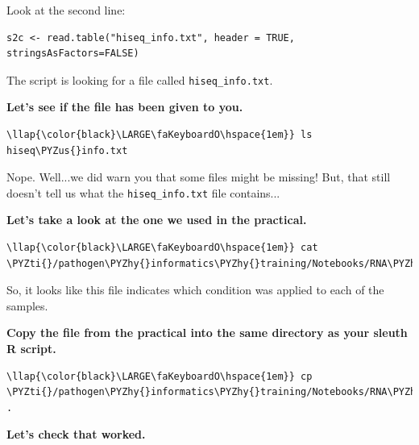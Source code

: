 \documentclass[11pt]{article}
\def\PYZus{\char`\_}
\def\PYZhy{\char`\-}
\def\PYZti{\char`\~}
\begin{document}
    Look at the second line:

\begin{verbatim}
s2c <- read.table("hiseq_info.txt", header = TRUE, stringsAsFactors=FALSE)
\end{verbatim}

The script is looking for a file called \texttt{hiseq\_info.txt}.

\textbf{Let's see if the file has been given to you.}

\begin{terminalinput}
\begin{Verbatim}[commandchars=\\\{\}]
\llap{\color{black}\LARGE\faKeyboardO\hspace{1em}} ls hiseq\PYZus{}info.txt
\end{Verbatim}
\end{terminalinput}


    Nope. Well...we did warn you that some files might be missing! But, that
still doesn't tell us what the \texttt{hiseq\_info.txt} file contains...

\textbf{Let's take a look at the one we used in the practical.}

\begin{terminalinput}
\begin{Verbatim}[commandchars=\\\{\}]
\llap{\color{black}\LARGE\faKeyboardO\hspace{1em}} cat \PYZti{}/pathogen\PYZhy{}informatics\PYZhy{}training/Notebooks/RNA\PYZhy{}Seq/data/hiseq\PYZus{}info.txt
\end{Verbatim}
\end{terminalinput}


    So, it looks like this file indicates which condition was applied to
each of the samples.

\textbf{Copy the file from the practical into the same directory as your
sleuth R script.}

\begin{terminalinput}
\begin{Verbatim}[commandchars=\\\{\}]
\llap{\color{black}\LARGE\faKeyboardO\hspace{1em}} cp \PYZti{}/pathogen\PYZhy{}informatics\PYZhy{}training/Notebooks/RNA\PYZhy{}Seq/data/hiseq\PYZus{}info.txt .
\end{Verbatim}
\end{terminalinput}


    \textbf{Let's check that worked.}
\end{document}
